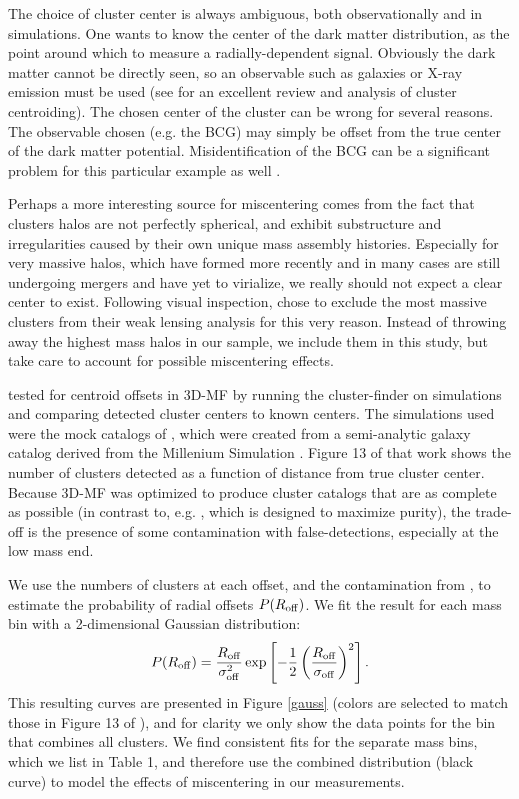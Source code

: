 The choice of cluster center is always ambiguous, both observationally and in simulations. One wants to know the center of the dark matter distribution, as the point around which to measure a radially-dependent signal. Obviously the dark matter cannot be directly seen, so an observable such as galaxies or X-ray emission must be used (see \citet{George12} for an excellent review and analysis of cluster centroiding). The chosen center of the cluster can be wrong for several reasons. The observable chosen (e.g. the BCG) may simply be offset from the true center of the dark matter potential. Misidentification of the BCG can be a significant problem for this particular example as well \citep{Johnston07}. 

Perhaps a more interesting source for miscentering comes from the fact that clusters halos are not perfectly spherical, and exhibit substructure and irregularities caused by their own unique mass assembly histories. Especially for very massive halos, which have formed more recently and in many cases are still undergoing mergers and have yet to virialize, we really should not expect a clear center to exist. Following visual inspection, \citet{Mandelbaum08b} chose to exclude the most massive clusters from their weak lensing analysis for this very reason. Instead of throwing away the highest mass halos in our sample, we include them in this study, but take care to account for possible miscentering effects. 

\citet{Milkeraitis10} tested for centroid offsets in \ac{3D-MF} by running the cluster-finder on simulations and comparing detected cluster centers to known centers. The simulations used were the mock catalogs of \citet{KW07}, which were created from a semi-analytic galaxy catalog \citep{DeLucia07} derived from the Millenium Simulation \citep{Springel05}. Figure 13 of that work shows the number of clusters detected as a function of distance from true cluster center. Because \ac{3D-MF} was optimized to produce cluster catalogs that are as complete as possible (in contrast to, e.g. \citet{Gillis11}, which is designed to maximize purity), the trade-off is the presence of some contamination with false-detections, especially at the low mass end.

We use the numbers of clusters at each offset, and the contamination from \citet{Milkeraitis10}, to estimate the probability of radial offsets $P(R_{\rm{off}})$. We fit the result for each mass bin with a 2-dimensional Gaussian distribution:
\begin{equation}
P(R_{\rm{off}}) = \frac{R_{\rm{off}}}{\sigma_{\rm{off}}^2} \exp \left[ -\frac{1}{2}\left( \frac{R_{\rm{off}}}{\sigma_{\rm{off}}} \right)^2 \right].
\label{PofRc}
\end{equation}
This resulting curves are presented in Figure \ref{gauss} (colors are selected to match those in Figure 13 of \citet{Milkeraitis10}), and for clarity we only show the data points for the bin that combines all clusters. We find consistent fits for the separate mass bins, which we list in Table 1, and therefore use the combined distribution (black curve) to model the effects of miscentering in our measurements.


